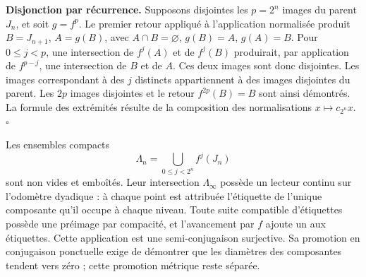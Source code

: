 \textbf{Disjonction par récurrence.} Supposons disjointes les \(p=2^n\) images du parent \(J_n\), et soit \(g=f^p\). Le premier retour appliqué à l’application normalisée produit \(B=J_{n+1}\), \(A=g(B)\), avec \(A\cap B=\varnothing\), \(g(B)=A\), \(g(A)=B\). Pour \(0\le j<p\), une intersection de \(f^j(A)\) et de \(f^j(B)\) produirait, par application de \(f^{p-j}\), une intersection de \(B\) et de \(A\). Ces deux images sont donc disjointes. Les images correspondant à des \(j\) distincts appartiennent à des images disjointes du parent. Les \(2p\) images disjointes et le retour \(f^{2p}(B)=B\) sont ainsi démontrés. La formule des extrémités résulte de la composition des normalisations \(x\mapsto c_{2^n}x\). \(\square\)

Les ensembles compacts
\[
\Lambda_n=\bigcup_{0\le j<2^n}f^j(J_n)
\]
sont non vides et emboîtés. Leur intersection \(\Lambda_\infty\) possède un lecteur continu sur l’odomètre dyadique : à chaque point est attribuée l’étiquette de l’unique composante qu’il occupe à chaque niveau. Toute suite compatible d’étiquettes possède une préimage par compacité, et l’avancement par \(f\) ajoute un aux étiquettes. Cette application est une semi-conjugaison surjective. Sa promotion en conjugaison ponctuelle exige de démontrer que les diamètres des composantes tendent vers zéro ; cette promotion métrique reste séparée.
